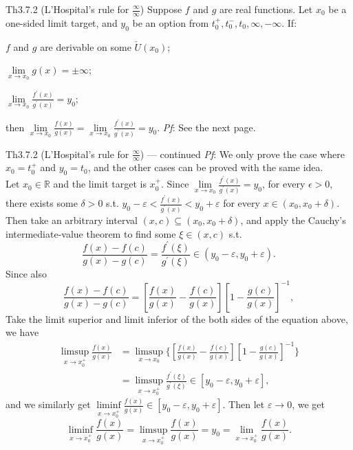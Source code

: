 \documentclass{article}
\begin{document}
\begin{Th}{Th3.7.2 (L'Hospital's rule for $\frac{\infty}{\infty}$)}
    Suppose $f$ and $g$ are real functions. Let $x_0$ be a one-sided limit target, and $y_0$ be an option from $t_0^+, t_0^-, t_0, \infty, -\infty$. If:
    \begin{compactenum}
        \item $f$ and $g$ are derivable on some $\check{U}(x_0)$;
        \item $\lim\limits_{x\to x_0} g(x) = \pm\infty$;
        \item $\lim\limits_{x\to x_0} \frac{f^\prime(x)}{g^\prime(x)} = y_0$;
    \end{compactenum}
    then $\lim\limits_{x\to x_0} \frac{f(x)}{g(x)} = \lim\limits_{x\to x_0} \frac{f^\prime(x)}{g^\prime(x)} = y_0$.
    \tcblower
    \textit{Pf}: See the next page.
\end{Th}

\begin{Th}{Th3.7.2 (L'Hospital's rule for $\frac{\infty}{\infty}$) —  continued}
    \textit{Pf}: We only prove the case where $x_0 = t_0^+$ and $y_0 = t_0$, and the other cases can be proved with the same idea.\\
    Let $x_0\in\mathbb{R}$ and the limit target is $x_0^+$. Since $\lim\limits_{x\to x_0} \frac{f^\prime(x)}{g^\prime(x)} = y_0$, for every $\epsilon>0$, there exists some $\delta>0$ s.t. $y_0-\varepsilon < \frac{f^\prime(x)}{g^\prime(x)} < y_0+\varepsilon$ for every $x\in (x_0, x_0+\delta)$. Then take an arbitrary interval $(x,c)\subseteq (x_0, x_0+\delta)$, and apply the Cauchy's intermediate-value theorem to find some $\xi\in (x,c)$ s.t. 
    $$ \frac{f(x)-f(c)}{g(x)-g(c)} = \frac{f^\prime(\xi)}{g^\prime(\xi)}\in (y_0-\varepsilon, y_0+\varepsilon). $$
    Since also 
    $$ \frac{f(x)-f(c)}{g(x)-g(c)} = \left[\frac{f(x)}{g(x)}-\frac{f(c)}{g(x)}\right]\left[1-\frac{g(c)}{g(x)}\right]^{-1}, $$
    Take the limit superior and limit inferior of the both sides of the equation above, we have
    $$ 
    \begin{aligned}
        \limsup\limits_{x\to x_0^+} \frac{f(x)}{g(x)} &= \limsup\limits_{x\to x_0} \Biggl\{\left[\frac{f(x)}{g(x)}-\frac{f(c)}{g(x)}\right]\left[1-\frac{g(c)}{g(x)}\right]^{-1}\Biggr\} \\ 
        &= \limsup\limits_{x\to x_0^+} \frac{f^\prime(\xi)}{g^\prime(\xi)}\in [y_0-\varepsilon, y_0+\varepsilon], 
    \end{aligned}
    $$
    and we similarly get $\liminf\limits_{x\to x_0^+} \frac{f(x)}{g(x)}\in [y_0-\varepsilon, y_0+\varepsilon]$. Then let $\varepsilon\rightarrow 0$, we get 
    $$ \liminf\limits_{x\to x_0^+} \frac{f(x)}{g(x)} = \limsup\limits_{x\to x_0^+} \frac{f(x)}{g(x)} = y_0 = \lim\limits_{x\to x_0^+} \frac{f(x)}{g(x)}. $$ 
\end{Th}
\end{document}
